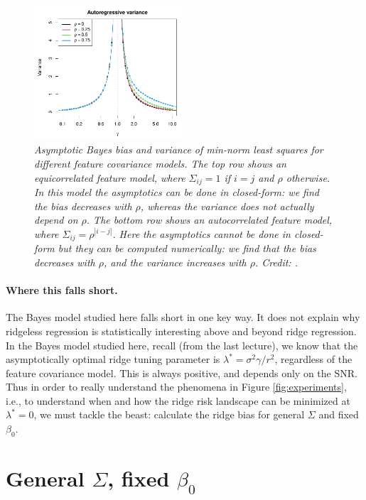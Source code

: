 \documentclass{article}
\begin{document}
\begin{figure}[p]
\includegraphics[width=0.49\textwidth]{var_ar.pdf}
\caption{\it Asymptotic Bayes bias and variance of min-norm least squares for
  different feature covariance models. The top row shows an equicorrelated
  feature model, where $\Sigma_{ij} = 1$ if $i=j$ and $\rho$ otherwise. In this 
  model the asymptotics can be done in closed-form: we find the bias decreases
  with $\rho$, whereas the variance does not actually depend on $\rho$. The
  bottom row shows an autocorrelated feature model, where $\Sigma_{ij} = 
  \rho^{|i-j|}$. Here the asymptotics cannot be done in closed-form but they can  
  be computed numerically: we find that the bias decreases with $\rho$, and the
  variance increases with $\rho$. Credit: \citet{hastie2022surprises}.}       
\label{fig:risk_ec_ar}
\end{figure}

\paragraph{Where this falls short.}

The Bayes model studied here falls short in one key way. It does not explain why
ridgeless regression is statistically interesting above and beyond ridge
regression. In the Bayes model studied here, recall (from the last lecture), we
know that the asymptotically optimal ridge tuning parameter is $\lambda^* =
\sigma^2 \gamma / r^2$, regardless of the feature covariance model. This is
always positive, and depends only on the SNR. Thus in order to really understand
the phenomena in Figure \ref{fig:experiments}, i.e., to understand when and how
the ridge risk landscape can be minimized at $\lambda^* = 0$, we must tackle the 
beast: calculate the ridge bias for general $\Sigma$ and fixed $\beta_0$.     

\section{General $\Sigma$, fixed $\beta_0$}
\end{document}
